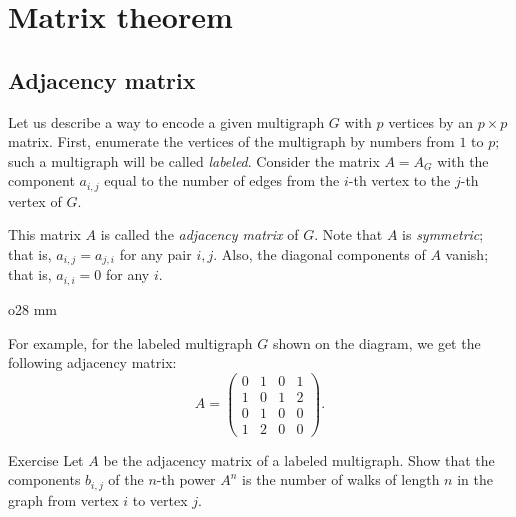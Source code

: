 \chapter{Matrix theorem}


\section{Adjacency matrix}

Let us describe a way to encode a given multigraph $G$ with $p$ vertices by an $p{\times}p$ matrix.
First, enumerate the vertices of the multigraph by numbers from $1$ to $p$;
such a multigraph will be called \emph{labeled}. 
Consider the matrix $A=A_G$ with the component $a_{i,j}$ equal to the number of edges from the $i$-th vertex to the $j$-th vertex of $G$.

This matrix $A$ is called the \emph{adjacency matrix} of $G$.
Note that $A$ is \emph{symmetric}; that is, $a_{i,j}=a_{j,i}$ for any pair $i,j$.
Also, the diagonal components of $A$ vanish; that is, $a_{i,i}=0$ for any $i$.

{

\begin{wrapfigure}{o}{28 mm}
\end{wrapfigure}


For example, for the labeled multigraph $G$ shown on the diagram, we get the following adjacency matrix:
\[A=\left(
\begin{matrix}
0&1&0&1
\\
1&0&1&2
\\
0&1&0&0
\\
1&2&0&0
\end{matrix}
\right).\]

}

\begin{thm}{Exercise}\label{ex:n(walks)}
Let $A$ be the adjacency matrix of a labeled multigraph.
Show that the components $b_{i,j}$ of the $n$-th power $A^n$ is the number of walks of length $n$ in the graph from vertex $i$ to vertex $j$. 
\end{thm}

